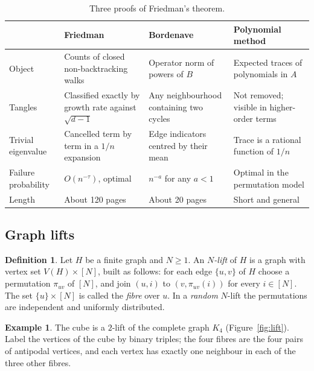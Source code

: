 \documentclass[11pt,letterpaper]{article}
\theoremstyle{definition}
\newtheorem{example}[theorem]{Example}
\newtheorem{definition}[theorem]{Definition}
\theoremstyle{remark}
\begin{document}
\begin{table}[ht]
\centering\small
\begin{tabular}{@{}L{0.17\textwidth}L{0.25\textwidth}L{0.24\textwidth}L{0.25\textwidth}@{}}
  \toprule
  & Friedman \cite{F} & Bordenave \cite{B} & Polynomial method \cite{CGTV}\\
  \midrule
  Object & Counts of closed non-backtracking walks & Operator norm of powers of $B$ & Expected traces of polynomials in $A$\\
    \addlinespace
  Tangles & Classified exactly by growth rate against $\sqrt{d-1}$ & Any neighbourhood containing two cycles & Not removed; visible in higher-order terms\\
    \addlinespace
  Trivial eigenvalue & Cancelled term by term in a $1/n$ expansion & Edge indicators centred by their mean & Trace is a rational function of $1/n$\\
    \addlinespace
  Failure probability & $O(n^{-\tau})$, optimal & $n^{-a}$ for any $a<1$ & Optimal in the permutation model\\
    \addlinespace
  Length & About 120 pages & About 20 pages & Short and general\\
  \bottomrule
\end{tabular}
\caption{Three proofs of Friedman's theorem.}
\label{tab:proofs}
\end{table}

\subsection{Graph lifts}

\begin{definition}
Let $H$ be a finite graph and $N\ge1$. An \emph{$N$-lift} of $H$ is a graph with vertex set
$V(H)\times[N]$, built as follows: for each edge $\{u,v\}$ of $H$ choose a permutation $\pi_{uv}$
of $[N]$, and join $(u,i)$ to $(v,\pi_{uv}(i))$ for every $i\in[N]$. The set $\{u\}\times[N]$ is
called the \emph{fibre} over $u$. In a \emph{random} $N$-lift the permutations are independent
and uniformly distributed.
\end{definition}

\begin{example}
The cube is a $2$-lift of the complete graph $K_4$ (Figure~\ref{fig:lift}). Label the vertices of
the cube by binary triples; the four fibres are the four pairs of antipodal vertices, and each
vertex has exactly one neighbour in each of the three other fibres.
\end{example}
\end{document}
